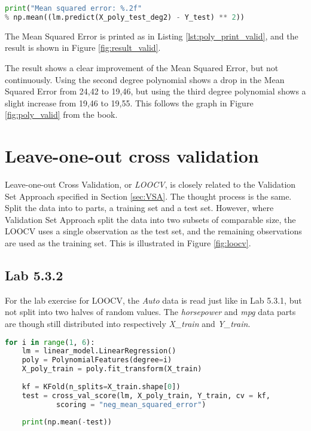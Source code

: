 \begin{lstlisting}[language=Python, label=lst:poly_print_valid, caption=Printing polynomial features with degree = 2]
print("Mean squared error: %.2f" 
% np.mean((lm.predict(X_poly_test_deg2) - Y_test) ** 2))
\end{lstlisting}

The Mean Squared Error is printed as in Listing \ref{lst:poly_print_valid}, and the result is shown in Figure \ref{fig:result_valid}.


The result shows a clear improvement of the Mean Squared Error, but not continuously. Using the second degree polynomial shows a drop in the Mean Squared Error from 24,42 to 19,46, but using the third degree polynomial shows a slight increase from 19,46 to 19,55. This follows the graph in Figure \ref{fig:poly_valid} from the book. 



\section{Leave-one-out cross validation}
Leave-one-out Cross Validation, or \emph{LOOCV}, is closely related to the Validation Set Approach specified in Section \ref{sec:VSA}. The thought process is the same. Split the data into to parts, a training set and a test set. However, where Validation Set Approach split the data into two subsets of comparable size, the LOOCV uses a single observation as the test set, and the remaining observations are used as the training set. This is illustrated in Figure \ref{fig:loocv}. 


\subsection{Lab 5.3.2}
For the lab exercise for LOOCV, the \emph{Auto} data is read just like in Lab 5.3.1, but not split into two halves of random values. The \emph{horsepower} and \emph{mpg} data parts are though still distributed into respectively \emph{X\_train} and \emph{Y\_train}.

\begin{lstlisting}[language=Python, label=lst:LOOCV, caption=Leave-one-out Cross Validation loop]
for i in range(1, 6):
	lm = linear_model.LinearRegression()
	poly = PolynomialFeatures(degree=i)
	X_poly_train = poly.fit_transform(X_train)
	
	kf = KFold(n_splits=X_train.shape[0]) 
	test = cross_val_score(lm, X_poly_train, Y_train, cv = kf, 
			scoring = "neg_mean_squared_error")
	
	print(np.mean(-test))
\end{lstlisting}

